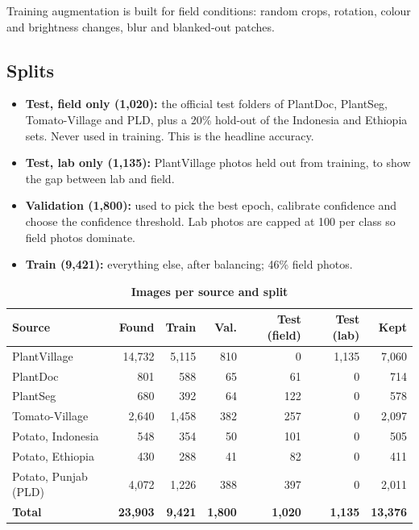 \documentclass[11pt,a4paper]{article}
\newcommand{\hdr}[1]{\textbf{#1}}
\begin{document}
Training augmentation is built for field conditions: random crops, rotation,
colour and brightness changes, blur and blanked-out patches.

\subsection{Splits}

\begin{itemize}
  \item \textbf{Test, field only (1,020):} the official test folders of PlantDoc,
        PlantSeg, Tomato-Village and PLD, plus a 20\% hold-out of the Indonesia
        and Ethiopia sets. Never used in training. This is the headline accuracy.
  \item \textbf{Test, lab only (1,135):} PlantVillage photos held out from
        training, to show the gap between lab and field.
  \item \textbf{Validation (1,800):} used to pick the best epoch, calibrate
        confidence and choose the confidence threshold. Lab photos are capped at
        100 per class so field photos dominate.
  \item \textbf{Train (9,421):} everything else, after balancing; 46\% field photos.
\end{itemize}

\begin{table}[H]
\centering
\small
\caption*{\textbf{Images per source and split}}
\begin{tabular}{@{}lrrrrrr@{}}
\toprule
\hdr{Source} & \hdr{Found} & \hdr{Train} & \hdr{Val.} & \hdr{Test (field)} & \hdr{Test (lab)} & \hdr{Kept} \\
\midrule
PlantVillage & 14,732 & 5,115 & 810 & 0 & 1,135 & 7,060 \\
PlantDoc & 801 & 588 & 65 & 61 & 0 & 714 \\
PlantSeg & 680 & 392 & 64 & 122 & 0 & 578 \\
Tomato-Village & 2,640 & 1,458 & 382 & 257 & 0 & 2,097 \\
Potato, Indonesia & 548 & 354 & 50 & 101 & 0 & 505 \\
Potato, Ethiopia & 430 & 288 & 41 & 82 & 0 & 411 \\
Potato, Punjab (PLD) & 4,072 & 1,226 & 388 & 397 & 0 & 2,011 \\
\midrule
\textbf{Total} & \textbf{23,903} & \textbf{9,421} & \textbf{1,800} & \textbf{1,020} & \textbf{1,135} & \textbf{13,376} \\
\bottomrule
\end{tabular}
\end{table}
\end{document}
